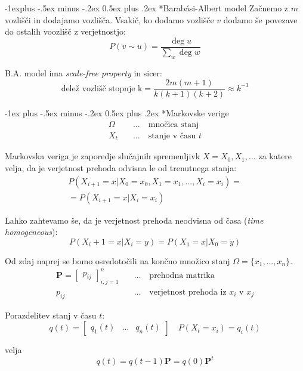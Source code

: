 \documentclass[a3paper,8pt]{extarticle}
\makeatletter
\renewcommand{\section}{\@startsection{section}{1}{0mm}%
                                {-1ex plus -.5ex minus -.2ex}%
                                {0.5ex plus .2ex}%
                                {\normalfont\large\bfseries}}
\renewcommand{\subsection}{\@startsection{subsection}{2}{0mm}%
                                {-1explus -.5ex minus -.2ex}%
                                {0.5ex plus .2ex}%
                                {\normalfont\normalsize\bfseries}}
\makeatother
\begin{document}
\begin{multicols}{4}
\subsection*{Barabási-Albert model}
Začnemo z $m$ vozlišči in dodajamo vozlišča. Vsakič, ko dodamo vozlišče $v$ dodamo še povezave do ostalih voozlišč z verjetnostjo:
\[P(v\sim u) = \frac{\deg u}{\sum_w \deg w}\]

B.A. model ima \textit{scale-free property} in sicer:
\[ \text{delež vozlišč stopnje k} = \frac{2m(m+1)}{k(k+1)(k+2)} \approx k^{-3} \]

\section*{Markovske verige}
\begin{align*}
    \Omega \quad &\dots \quad \text{mnočica stanj} \\
    X_t \quad &\dots \quad \text{stanje v času $t$}
\end{align*}

Markovska veriga je zaporedje slučajnih spremenljivk $X = X_0, X_1, \dots$ za katere velja, da je verjetnost prehoda odvisna le od trenutnega stanja:
\begin{multline*}
    P(X_{i+1} = x | X_0 = x_0, X_1 = x_1, \dots, X_i = x_i) = \\
    = P(X_{i+1} = x | X_i = x_i)
\end{multline*}

Lahko zahtevamo še, da je verjetnost prehoda neodvisna od časa (\textit{time homogeneous}):
\[ P(X_i+1 = x | X_i = y) = P(X_1 = x | X_0 = y)\]

Od zdaj naprej se bomo osredotočili na končno množico stanj $\Omega = \{x_1, \dots, x_n\}$. 
\begin{align*}
    \mathbf{P} = \begin{bmatrix}
        p_{ij}
    \end{bmatrix}_{i,j = 1}^n\quad &\dots \quad \text{prehodna matrika} \\
    p_{ij} \quad &\dots \quad \text{verjetnost prehoda iz $x_i$ v $x_j$}
\end{align*}

Porazdelitev stanj v času $t$:
\[q(t) = \begin{bmatrix}
    q_1(t) & \dots & q_n(t)
\end{bmatrix} \quad P(X_t = x_i) = q_i(t) \] 

velja
\[ q(t) = q(t-1) \mathbf{P} = q(0) \mathbf{P}^t \]


\end{multicols}
\end{document}
